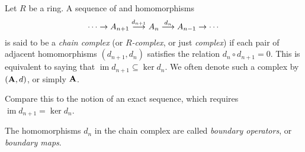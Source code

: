 \documentclass{article}
\def\im{\operatorname{im}}
\def\ker{\operatorname{ker}}
\begin{document}

Let $R$ be a ring.
A sequence of  and homomorphisms
\[
  \cdots \rightarrow
  A_{n+1} \buildrel {d_{n+1}} \over \longrightarrow
  A_n \buildrel {d_n} \over \longrightarrow
  A_{n-1} \rightarrow
  \cdots
\]
is said to be a \emph{chain complex}
(or \emph{$R$-complex}, or just \emph{complex})
if each pair of adjacent homomorphisms $(d_{n+1}, d_n)$
satisfies the relation $d_n\circ d_{n+1} = 0$.
This is equivalent to saying that 
$\im d_{n+1} \subseteq \ker d_n$.
We often denote such a complex by $({\bold A}, d)$, or simply ${\bold A}$.

Compare this to the notion of an exact sequence,
which requires $\im d_{n+1} = \ker d_n$.

The homomorphisms $d_n$ in the chain complex
are called \emph{boundary operators}, or \emph{boundary maps}.
\end{document}
